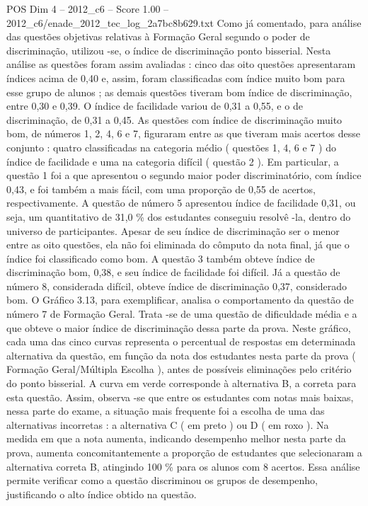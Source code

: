 \begin{textsample}{POS Dim 4 – 2012\_c6 – Score 1.00 – 2012\_c6/enade\_2012\_tec\_log\_2a7bc8b629.txt}
Como já comentado, para análise das questões objetivas relativas à Formação Geral segundo o poder de discriminação, utilizou -se, o índice de discriminação ponto bisserial.
Nesta análise as questões foram assim avaliadas : cinco das oito questões apresentaram índices acima de 0,40 e, assim, foram classificadas com índice muito bom para esse grupo de alunos ; as demais questões tiveram bom índice de discriminação, entre 0,30 e 0,39.
O índice de facilidade variou de 0,31 a 0,55, e o de discriminação, de 0,31 a 0,45.
As questões com índice de discriminação muito bom, de números 1, 2, 4, 6 e 7, figuraram entre as que tiveram mais acertos desse conjunto : quatro classificadas na categoria médio ( questões 1, 4, 6 e 7 ) do índice de facilidade e uma na categoria difícil ( questão 2 ).
Em particular, a questão 1 foi a que apresentou o segundo maior poder discriminatório, com índice 0,43, e foi também a mais fácil, com uma proporção de 0,55 de acertos, respectivamente.
A questão de número 5 apresentou índice de facilidade 0,31, ou seja, um quantitativo de 31,0 \% dos estudantes conseguiu resolvê -la, dentro do universo de participantes.
Apesar de seu índice de discriminação ser o menor entre as oito questões, ela não foi eliminada do cômputo da nota final, já que o índice foi classificado como bom.
A questão 3 também obteve índice de discriminação bom, 0,38, e seu índice de facilidade foi difícil.
Já a questão de número 8, considerada difícil, obteve índice de discriminação 0,37, considerado bom.
O Gráfico 3.13, para exemplificar, analisa o comportamento da questão de número 7 de Formação Geral.
Trata -se de uma questão de dificuldade média e a que obteve o maior índice de discriminação dessa parte da prova.
Neste gráfico, cada uma das cinco curvas representa o percentual de respostas em determinada alternativa da questão, em função da nota dos estudantes nesta parte da prova ( Formação Geral/Múltipla Escolha ), antes de possíveis eliminações pelo critério do ponto bisserial.
A curva em verde corresponde à alternativa B, a correta para esta questão.
Assim, observa -se que entre os estudantes com notas mais baixas, nessa parte do exame, a situação mais frequente foi a escolha de uma das alternativas incorretas : a alternativa C ( em preto ) ou D ( em roxo ).
Na medida em que a nota aumenta, indicando desempenho melhor nesta parte da prova, aumenta concomitantemente a proporção de estudantes que selecionaram a alternativa correta B, atingindo 100 \% para os alunos com 8 acertos.
Essa análise permite verificar como a questão discriminou os grupos de desempenho, justificando o alto índice obtido na questão.

\end{textsample}
